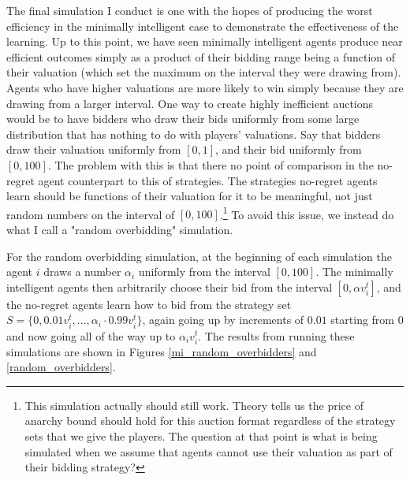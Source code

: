 \documentclass[12pt,twoside]{reedthesis}
\begin{document}
The final simulation I conduct is one with the hopes of producing the worst efficiency in the minimally intelligent case to demonstrate the effectiveness of the learning. Up to this point, we have seen minimally intelligent agents produce near efficient outcomes simply as a product of their bidding range being a function of their valuation (which set the maximum on the interval they were drawing from). Agents who have higher valuations are more likely to win simply because they are drawing from a larger interval. One way to create highly inefficient auctions would be to have bidders who draw their bids uniformly from some large distribution that has nothing to do with players' valuations. Say that bidders draw their valuation uniformly from $[0,1]$, and their bid uniformly from $[0,100]$. The problem with this is that there no point of comparison in the no-regret agent counterpart to this of strategies. The strategies no-regret agents learn should be functions of their valuation for it to be meaningful, not just random numbers on the interval of $[0,100]$.\footnote{This simulation actually should still work. Theory tells us the price of anarchy bound should hold for this auction format regardless of the strategy sets that we give the players. The question at that point is what is being simulated when we assume that agents cannot use their valuation as part of their bidding strategy?} To avoid this issue, we instead do what I call a "random overbidding" simulation. 

For the random overbidding simulation, at the beginning of each simulation the agent $i$ draws a number $\alpha_i$ uniformly from the interval $[0,100]$. The minimally intelligent agents then arbitrarily choose their bid from the interval $[0, \alpha v_i^t]$, and the no-regret agents learn how to bid from the strategy set $S = \{ 0, 0.01v_i^t, \ldots, \alpha_i \cdot 0.99 v_i^t \}$, again going up by increments of $0.01$ starting from $0$ and now going all of the way up to $\alpha_i v_i^t$. The results from running these simulations are shown in Figures \ref{mi_random_overbidders} and \ref{random_overbidders}.
\end{document}
